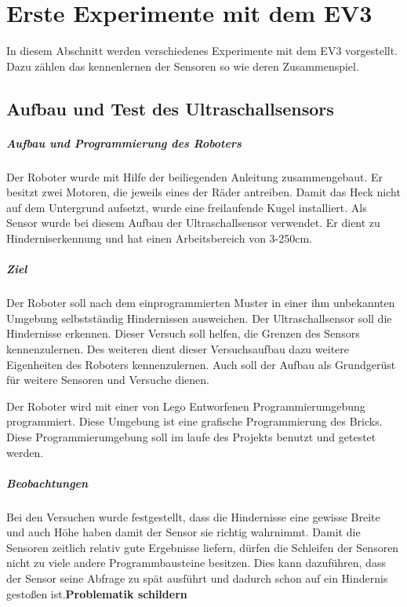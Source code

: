 \chapter{Erste Experimente mit dem EV3}
In diesem Abschnitt werden verschiedenes Experimente mit dem EV3 vorgestellt. Dazu zählen das kennenlernen der Sensoren so wie deren Zusammenspiel. 
\section{Aufbau und Test des Ultraschallsensors}
\paragraph{Aufbau und Programmierung des Roboters}
Der Roboter wurde mit Hilfe der beiliegenden Anleitung zusammengebaut. Er besitzt zwei Motoren, die jeweils eines der Räder antreiben. Damit das Heck nicht auf dem Untergrund aufsetzt, wurde eine freilaufende Kugel installiert. 
Als Sensor wurde bei diesem Aufbau der Ultraschallsensor verwendet. Er dient zu Hinderniserkennung und hat einen Arbeitsbereich von 3-250cm.

\paragraph{Ziel}
Der Roboter soll nach dem einprogrammierten Muster in einer ihm unbekannten Umgebung selbstständig Hindernissen ausweichen. Der Ultraschallsensor soll die Hindernisse erkennen. Dieser Versuch soll helfen, die Grenzen des Sensors kennenzulernen. Des weiteren dient dieser Versuchsaufbau dazu weitere Eigenheiten des Roboters kennenzulernen. Auch soll der Aufbau als Grundgerüst für weitere Sensoren und Versuche dienen.  

Der Roboter wird mit einer von Lego Entworfenen Programmierumgebung programmiert. Diese Umgebung ist eine grafische Programmierung des Bricks. Diese Programmierumgebung soll im laufe des Projekts benutzt und getestet werden.
 
\paragraph{Beobachtungen} Bei den Versuchen wurde festgestellt, dass die Hindernisse eine gewisse Breite und auch Höhe haben damit der Sensor sie richtig wahrnimmt.
Damit die Sensoren zeitlich relativ gute Ergebnisse liefern, dürfen die Schleifen der Sensoren nicht zu viele andere Programmbausteine besitzen. Dies kann dazuführen, dass der Sensor seine Abfrage zu spät ausführt und dadurch schon auf ein Hindernis gestoßen ist.\textbf{Problematik schildern}

